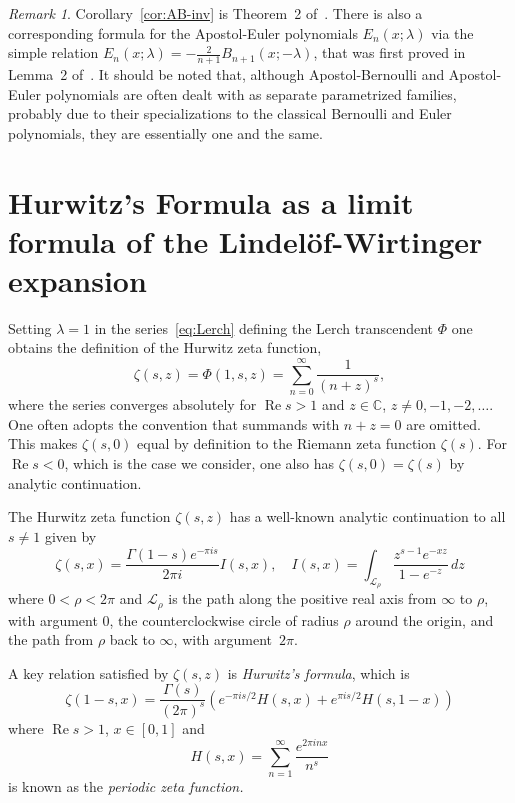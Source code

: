 \documentclass[11pt,a4paper,reqno]{amsart}
\newcommand{\C}{\mathbb{C}}
\renewcommand{\Re}{\operatorname{Re}}
\theoremstyle{plain}
\theoremstyle{remark}
\newtheorem{remark}{Remark}
\numberwithin{equation}{section}
\begin{document}
\begin{remark}
Corollary~\ref{cor:AB-inv} is Theorem~2 of~\cite{Bayad}. There is also a corresponding formula for the Apostol-Euler polynomials $E_{n}(x;\lambda)$ via the simple relation $E_n(x;\lambda) = -\frac{2}{n+1} B_{n+1}(x;-\lambda)$, that was first proved in Lemma~2 of~\cite{NRV-MC}. It should be noted that, although Apostol-Bernoulli and Apostol-Euler polynomials are often dealt with as separate parametrized families, probably due to their specializations to the classical Bernoulli and Euler polynomials, they are essentially one and the same.
\end{remark}

\section{Hurwitz's Formula as a limit formula of the Lindel\"of-Wirtinger expansion}
\label{sec:HW}


Setting $\lambda = 1$ in the series~\eqref{eq:Lerch} defining the Lerch transcendent $\Phi$ one obtains the definition of the Hurwitz zeta function,
\[
	\zeta(s,z) = \Phi(1,s,z) = \sum_{n=0}^{\infty} \frac{1}{(n + z)^{s}},
\]
where the series converges absolutely	 for $\Re s > 1$ and $z \in \C$, $z \neq 0,-1,-2,\dots$. One often adopts the convention that summands with $n + z = 0$ are omitted. This makes $\zeta(s,0)$ equal by definition to the Riemann zeta function $\zeta(s)$. For $\Re s < 0$, which is the case we consider, one also has $\zeta(s,0) = \zeta(s)$ by analytic continuation.

The Hurwitz zeta function $\zeta(s,z)$ has a well-known analytic continuation to all $s \neq 1$ given by
%
\begin{equation}
\label{eq:HZ-int}
	\zeta(s,x) = \frac{\Gamma(1-s) e^{-\pi i s}}{2\pi i} I(s,x),
	\quad
	I(s,x) = \int_{\mathcal{L}_{\rho}} \frac{z^{s-1} e^{-xz}}{1-e^{-z}} \, dz
\end{equation}
%
where $0 < \rho < 2\pi$ and $\mathcal{L}_{\rho}$ is the path along the positive real axis from $\infty$ to $\rho$, with argument $0$, the counterclockwise circle of radius $\rho$ around the origin, and the path from $\rho$ back to $\infty$, with argument~$2\pi$.

A key relation satisfied by $\zeta(s,z)$ is \emph{Hurwitz's formula}, which is
%
\begin{equation}
	\label{eq:HF}
	\zeta(1-s,x) = \frac{\Gamma(s)}{(2\pi)^{s}}
	               \left( e^{-\pi i s/2} H(s,x) + e^{\pi i s/2} H(s,1-x) \right)
\end{equation}
%
where $\Re s > 1$, $x \in [0,1]$ 
and
%
\begin{equation*}
	H(s,x) = \sum_{n=1}^{\infty} \frac{e^{2 \pi i n x}}{n^{s}}
\end{equation*}
%
is known as the \emph{periodic zeta function.} 
\end{document}
